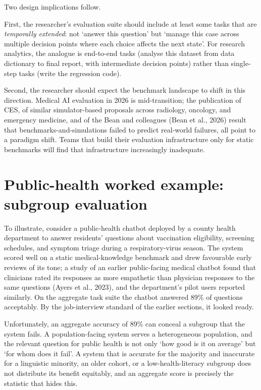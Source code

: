 \documentclass[
  letterpaper,
  11pt]{scrbook}
\begin{document}
Two design implications follow.

First, the researcher's evaluation suite should include at least some
tasks that are \emph{temporally extended}: not `answer this question'
but `manage this case across multiple decision points where each choice
affects the next state'. For research analytics, the analogue is
end-to-end tasks (analyse this dataset from data dictionary to final
report, with intermediate decision points) rather than single-step tasks
(write the regression code).

Second, the researcher should expect the benchmark landscape to shift in
this direction. Medical AI evaluation in 2026 is mid-transition; the
publication of CES, of similar simulator-based proposals across
radiology, oncology, and emergency medicine, and of the Bean and
colleagues ({Bean et al.}, 2026) result that benchmarks-and-simulations
failed to predict real-world failures, all point to a paradigm shift.
Teams that build their evaluation infrastructure only for static
benchmarks will find that infrastructure increasingly inadequate.

\section{Public-health worked example: subgroup
evaluation}\label{public-health-worked-example-subgroup-evaluation}

To illustrate, consider a public-health chatbot deployed by a county
health department to answer residents' questions about vaccination
eligibility, screening schedules, and symptom triage during a
respiratory-virus season. The system scored well on a static
medical-knowledge benchmark and drew favourable early reviews of its
tone; a study of an earlier public-facing medical chatbot found that
clinicians rated its responses as more empathetic than physician
responses to the same questions ({Ayers et al.}, 2023), and the
department's pilot users reported similarly. On the aggregate task suite
the chatbot answered 89\% of questions acceptably. By the job-interview
standard of the earlier sections, it looked ready.

Unfortunately, an aggregate accuracy of 89\% can conceal a subgroup that
the system fails. A population-facing system serves a heterogeneous
population, and the relevant question for public health is not only `how
good is it on average' but `for whom does it fail'. A system that is
accurate for the majority and inaccurate for a linguistic minority, an
older cohort, or a low-health-literacy subgroup does not distribute its
benefit equitably, and an aggregate score is precisely the statistic
that hides this.
\end{document}
